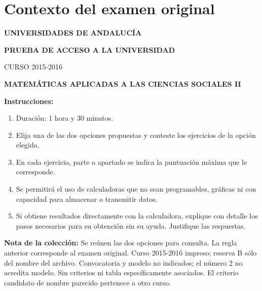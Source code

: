 \section*{Contexto del examen original}
\textbf{UNIVERSIDADES DE ANDALUCÍA}\par
\textbf{PRUEBA DE ACCESO A LA UNIVERSIDAD}\par
CURSO 2015-2016\par
\textbf{MATEMÁTICAS APLICADAS A LAS CIENCIAS SOCIALES II}

\textbf{Instrucciones:}
\begin{enumerate}[label=\textbf{\alph*)}]
  \item Duración: 1 hora y 30 minutos.
  \item Elija una de las dos opciones propuestas y conteste los ejercicios de la opción elegida.
  \item En cada ejercicio, parte o apartado se indica la puntuación máxima que le corresponde.
  \item Se permitirá el uso de calculadoras que no sean programables, gráficas ni con capacidad para almacenar o transmitir datos.
  \item Si obtiene resultados directamente con la calculadora, explique con detalle los pasos necesarios para su obtención sin su ayuda. Justifique las respuestas.
\end{enumerate}
\noindent\textbf{Nota de la colección:} Se reúnen las dos opciones para consulta.
La regla anterior corresponde al examen original. Curso 2015-2016 impreso; reserva B sólo del nombre del archivo. Convocatoria y modelo no indicados; el número 2 no acredita modelo. Sin criterios ni tabla específicamente asociados. El criterio candidato de nombre parecido pertenece a otro curso.
\par\medskip
